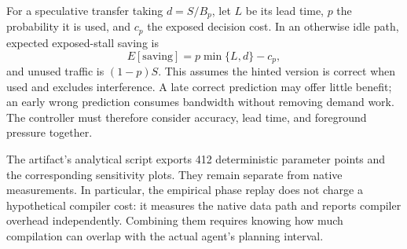 For a speculative transfer taking $d=S/B_p$, let $L$ be its lead time,
$p$ the probability it is used, and $c_p$ the exposed decision cost. In an
otherwise idle path, expected exposed-stall saving is
\begin{equation}
 E[\mathrm{saving}]=p\min\{L,d\}-c_p,
\end{equation}
and unused traffic is $(1-p)S$. This assumes the hinted version is correct
when used and excludes interference. A late correct prediction may offer
little benefit; an early wrong prediction consumes bandwidth without
removing demand work. The controller must therefore consider accuracy,
lead time, and foreground pressure together.

The artifact's analytical script exports 412 deterministic parameter points
and the corresponding sensitivity plots. They remain separate from native
measurements. In particular, the empirical phase replay does not charge a
hypothetical compiler cost: it measures the native data path and reports
compiler overhead independently. Combining them requires knowing how much
compilation can overlap with the actual agent's planning interval.
